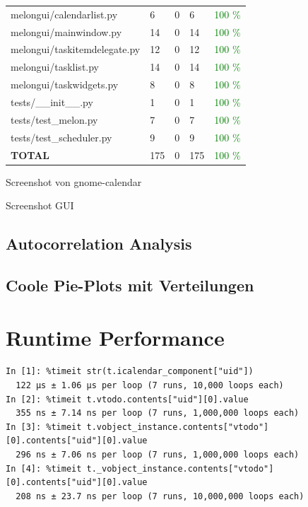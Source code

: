 \documentclass{prettytex/ox/mmsc-special-topic}
\begin{document}
\begin{table}[H]
\begin{tabular}{lllll}
      melongui/calendarlist.py        & 6         & 0        & 6         & \textcolor{green}{100 \%} \\
      melongui/mainwindow.py          & 14        & 0        & 14        & \textcolor{green}{100 \%} \\
      melongui/taskitemdelegate.py    & 12        & 0        & 12        & \textcolor{green}{100 \%} \\
      melongui/tasklist.py            & 14        & 0        & 14        & \textcolor{green}{100 \%} \\
      melongui/taskwidgets.py         & 8         & 0        & 8         & \textcolor{green}{100 \%} \\
      tests/\_\_init\_\_.py           & 1         & 0        & 1         & \textcolor{green}{100 \%} \\
      tests/test\_melon.py            & 7         & 0        & 7         & \textcolor{green}{100 \%} \\
      tests/test\_scheduler.py        & 9         & 0        & 9         & \textcolor{green}{100 \%} \\
      \hline
      \bf TOTAL                       & 175       & 0        & 175       & \textcolor{green}{100 \%} \\
      \hline
    \end{tabular}
  \end{table}

  Screenshot von gnome-calendar

  Screenshot GUI

  \subsection{Autocorrelation Analysis}
  \subsection{Coole Pie-Plots mit Verteilungen}

  \section{Runtime Performance}
  \begin{verbatim}
In [1]: %timeit str(t.icalendar_component["uid"])
  122 µs ± 1.06 µs per loop (7 runs, 10,000 loops each)
In [2]: %timeit t.vtodo.contents["uid"][0].value
  355 ns ± 7.14 ns per loop (7 runs, 1,000,000 loops each)
In [3]: %timeit t.vobject_instance.contents["vtodo"][0].contents["uid"][0].value
  296 ns ± 7.06 ns per loop (7 runs, 1,000,000 loops each)
In [4]: %timeit t._vobject_instance.contents["vtodo"][0].contents["uid"][0].value
  208 ns ± 23.7 ns per loop (7 runs, 10,000,000 loops each)
  \end{verbatim}
\end{document}
